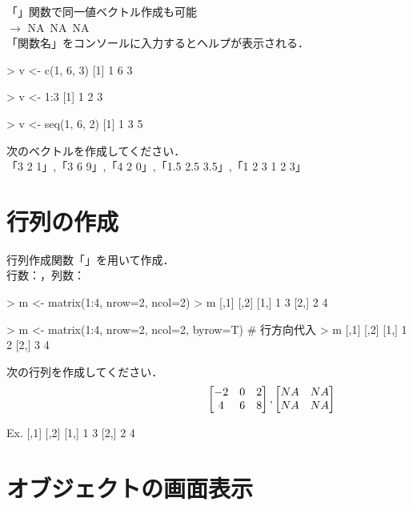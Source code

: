 \documentclass[../main]{subfiles}
\begin{document}
「」関数で同一値ベクトル作成も可能\\
 $\rightarrow$ NA~NA~NA\\
「関数名」をコンソールに入力するとヘルプが表示される．

\begin{ConsoleR}
> v <- c(1, 6, 3)
[1] 1 6 3

> v <- 1:3
[1] 1 2 3

> v <- seq(1, 6, 2)
[1] 1 3 5
\end{ConsoleR}

\begin{exercise}
  次のベクトルを作成してください．\\
  「3 2 1」,「3 6 9」,「4 2 0」,「1.5 2.5 3.5」,「1 2 3 1 2 3」
  \tcblower
\end{exercise}

\section{行列の作成}

{
  行列作成関数「」を用いて作成．\\
  行数：，列数：
}

\begin{ConsoleR}
> m <- matrix(1:4, nrow=2, ncol=2)
> m
     [,1] [,2]
[1,]    1    3
[2,]    2    4

> m <- matrix(1:4, nrow=2, ncol=2, byrow=T) # 行方向代入
> m
     [,1] [,2]
[1,]    1    2
[2,]    3    4
\end{ConsoleR}

\begin{exercise}
  次の行列を作成してください．
  \vspace{-9mm}
  \[
    \hspace{40mm}
    \begin{bmatrix}
      -2 & 0 & 2\\
        4 & 6 & 8
    \end{bmatrix}
    ,
    \begin{bmatrix}
      NA & NA\\
      NA & NA
    \end{bmatrix}
  \]
  \tcblower
  \begin{ConsoleR}
Ex.          [,1] [,2]
      [1,]   1    3
      [2,]   2    4
  \end{ConsoleR}
\end{exercise}

\section{オブジェクトの画面表示}
\end{document}
